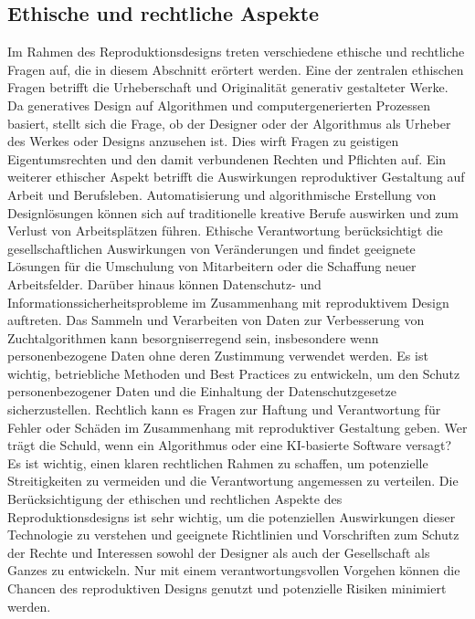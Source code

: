 \subsection*{Ethische und rechtliche Aspekte}
Im Rahmen des Reproduktionsdesigns treten verschiedene ethische und rechtliche Fragen auf, die in diesem Abschnitt erörtert werden. Eine der zentralen ethischen Fragen betrifft die Urheberschaft und Originalität generativ gestalteter Werke. Da generatives Design auf Algorithmen und computergenerierten Prozessen basiert, stellt sich die Frage, ob der Designer oder der Algorithmus als Urheber des Werkes oder Designs anzusehen ist. Dies wirft Fragen zu geistigen Eigentumsrechten und den damit verbundenen Rechten und Pflichten auf.  
 Ein weiterer ethischer Aspekt betrifft die Auswirkungen reproduktiver Gestaltung auf Arbeit und Berufsleben. Automatisierung und algorithmische Erstellung von Designlösungen können sich auf traditionelle kreative Berufe auswirken und zum Verlust von Arbeitsplätzen führen. Ethische Verantwortung berücksichtigt die gesellschaftlichen Auswirkungen von Veränderungen  und findet geeignete Lösungen für die Umschulung von Mitarbeitern oder die Schaffung neuer Arbeitsfelder. 
 Darüber hinaus können Datenschutz- und Informationssicherheitsprobleme im Zusammenhang mit reproduktivem Design auftreten. Das Sammeln und Verarbeiten von Daten zur Verbesserung von Zuchtalgorithmen kann besorgniserregend sein, insbesondere wenn personenbezogene Daten ohne deren Zustimmung  verwendet werden. Es ist wichtig, betriebliche Methoden und Best Practices zu entwickeln, um den Schutz personenbezogener Daten und die Einhaltung  der Datenschutzgesetze sicherzustellen. Rechtlich kann es Fragen zur Haftung und Verantwortung für Fehler oder Schäden im Zusammenhang mit reproduktiver Gestaltung geben. Wer trägt die Schuld, wenn ein Algorithmus oder eine KI-basierte Software versagt? Es ist wichtig, einen klaren rechtlichen Rahmen zu schaffen, um potenzielle Streitigkeiten zu vermeiden und die Verantwortung angemessen zu verteilen. 
 Die Berücksichtigung der ethischen und rechtlichen Aspekte des Reproduktionsdesigns ist sehr wichtig, um die potenziellen Auswirkungen dieser Technologie zu verstehen und geeignete Richtlinien und Vorschriften zum Schutz der Rechte und Interessen sowohl der Designer als auch der Gesellschaft als Ganzes zu entwickeln. Nur mit einem verantwortungsvollen Vorgehen können die Chancen des reproduktiven Designs genutzt und potenzielle Risiken minimiert werden.

